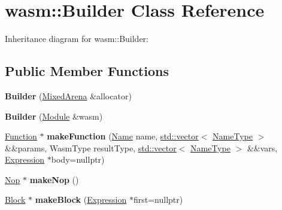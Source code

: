 \hypertarget{classwasm_1_1_builder}{}\section{wasm\+:\+:Builder Class Reference}
\label{classwasm_1_1_builder}


Inheritance diagram for wasm\+:\+:Builder\+:
\subsection*{Public Member Functions}
\begin{DoxyCompactItemize}
\item 
\mbox{\label{classwasm_1_1_builder_a9b791416b7c2a6472e746a8289650879}} 
{\bfseries Builder} (\mbox{\hyperlink{struct_mixed_arena}{Mixed\+Arena}} \&allocator)
\item 
\mbox{\label{classwasm_1_1_builder_a86a957ab3d2f56298599ee79fa75363a}} 
{\bfseries Builder} (\mbox{\hyperlink{classwasm_1_1_module}{Module}} \&wasm)
\item 
\mbox{\label{classwasm_1_1_builder_a632fd86e6d67807981283d0d89e05982}} 
\mbox{\hyperlink{classwasm_1_1_function}{Function}} $\ast$ {\bfseries make\+Function} (\mbox{\hyperlink{structwasm_1_1_name}{Name}} name, \mbox{\hyperlink{classstd_1_1vector}{std\+::vector}}$<$ \mbox{\hyperlink{structwasm_1_1_name_type}{Name\+Type}} $>$ \&\&params, Wasm\+Type result\+Type, \mbox{\hyperlink{classstd_1_1vector}{std\+::vector}}$<$ \mbox{\hyperlink{structwasm_1_1_name_type}{Name\+Type}} $>$ \&\&vars, \mbox{\hyperlink{classwasm_1_1_expression}{Expression}} $\ast$body=nullptr)
\item 
\mbox{\label{classwasm_1_1_builder_aef85108b77b90fa4a77c920dc040a3e2}} 
\mbox{\hyperlink{classwasm_1_1_nop}{Nop}} $\ast$ {\bfseries make\+Nop} ()
\item 
\mbox{\label{classwasm_1_1_builder_af56604d8a611c78d84c917620085d2b7}} 
\mbox{\hyperlink{classwasm_1_1_block}{Block}} $\ast$ {\bfseries make\+Block} (\mbox{\hyperlink{classwasm_1_1_expression}{Expression}} $\ast$first=nullptr)
\item 
\mbox{\label{classwasm_1_1_builder_afc1503ba2bb1421cf292f88b28ab1458}} 

\end{DoxyCompactItemize}

